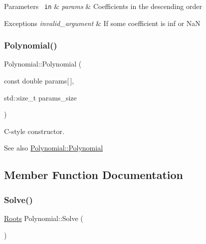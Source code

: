 \begin{DoxyParams}[1]{Parameters}
\mbox{\texttt{ in}}  & {\em params} & Coefficients in the descending order \\
\hline
\end{DoxyParams}

\begin{DoxyExceptions}{Exceptions}
{\em invalid\+\_\+argument} & If some coefficient is inf or NaN \\
\hline
\end{DoxyExceptions}
\mbox{\label{class_polynomial_a0e0ad9a369edaaae98750da039cbde35}} 
\subsubsection{\texorpdfstring{Polynomial()}{Polynomial()}\hspace{0.1cm}{\footnotesize\ttfamily [2/2]}}
{\footnotesize\ttfamily Polynomial\+::\+Polynomial (\begin{DoxyParamCaption}\item[{const double}]{params\mbox{[}$\,$\mbox{]},  }\item[{std\+::size\+\_\+t}]{params\+\_\+size }\end{DoxyParamCaption})\hspace{0.3cm}{\ttfamily [explicit]}}

C-\/style constructor. \begin{DoxySeeAlso}{See also}
\mbox{\hyperlink{class_polynomial_a4884391c3366097d44556691daa3f942}{Polynomial\+::\+Polynomial}} 
\end{DoxySeeAlso}


\subsection{Member Function Documentation}
\mbox{\label{class_polynomial_ac1a8732edb10e52f5ff4bba6aee83593}} 
\subsubsection{\texorpdfstring{Solve()}{Solve()}}
{\footnotesize\ttfamily \mbox{\hyperlink{struct_roots}{Roots}} Polynomial\+::\+Solve (\begin{DoxyParamCaption}{ }\end{DoxyParamCaption})}

